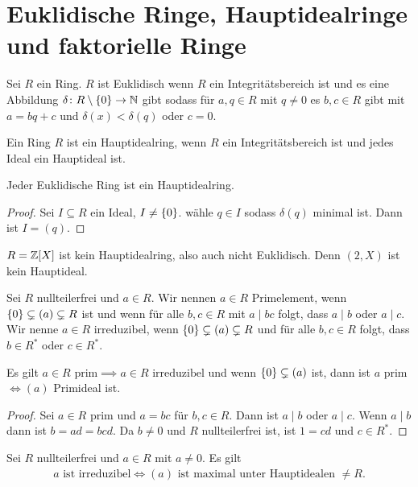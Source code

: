\section{Euklidische Ringe, Hauptidealringe und faktorielle Ringe}
\begin{Def}
	Sei \(R\) ein Ring. \(R\) ist Euklidisch wenn \(R\) ein Integritätsbereich ist und es eine Abbildung \(\delta\colon R\setminus\{0\}\to\mathbb{N}\) gibt sodass für \(a,q\in R\) mit \(q\neq 0\) es \(b,c\in R\) gibt mit \(a=bq+c\) und \(\delta(x)<\delta(q)\) oder \(c=0\).
\end{Def}
\begin{Def}
	Ein Ring \(R\) ist ein Hauptidealring, wenn \(R\) ein Integritätsbereich ist und jedes Ideal ein Hauptideal ist.
\end{Def}
\begin{Satz}
	Jeder Euklidische Ring ist ein Hauptidealring.
\end{Satz}
\begin{proof}
	Sei \(I\subseteq R\) ein Ideal, \(I\neq \{0\}\). wähle \(q\in I\) sodass \(\delta(q)\) minimal ist. Dann ist \(I=(q)\).
\end{proof}
\begin{Bsp}
	\(R=\mathbb{Z}[X]\) ist kein Hauptidealring, also auch nicht Euklidisch. Denn \((2,X)\) ist kein Hauptideal.
\end{Bsp}
\begin{Def}
	Sei \(R\) nullteilerfrei und \(a\in R\). Wir nennen \(a\in R\) Primelement, wenn \(\{0\}\subsetneq (a)\subsetneq R\) ist und wenn für alle \(b,c\in R\) mit \(a\mid bc\) folgt, dass \(a\mid b\) oder \(a\mid c\).\\
	Wir nenne \(a\in R\) irreduzibel, wenn \(\{0\}\subsetneq (a)\subsetneq R\) und für alle \(b,c\in R\) folgt, dass \(b\in R^*\) oder \(c\in R^*\).
\end{Def}
\begin{Bem}
	Es gilt \(a\in R\text{ prim}\implies a\in R\text{ irreduzibel}\) und wenn \(\{0\}\subsetneq (a)\) ist, dann ist \(a\) prim \(\iff (a)\) Primideal ist.
\end{Bem}
\begin{proof}
	Sei \(a\in R\) prim und \(a=bc\) für \(b,c\in R\). Dann ist \(a\mid b\) oder \(a\mid c\). Wenn \(a\mid b\) dann ist \(b=ad=bcd\). Da \(b\neq 0\) und \(R\) nullteilerfrei ist, ist \(1=cd\) und \(c\in R^*\).
\end{proof}
\begin{Lemma}
	Sei \(R\) nullteilerfrei und \(a\in R\) mit \(a\neq 0\). Es gilt 
	\begin{align*}
		a \text{ ist irreduzibel} \iff (a) \text{ ist maximal unter Hauptidealen \(\neq R\).}
	\end{align*}
\end{Lemma}
